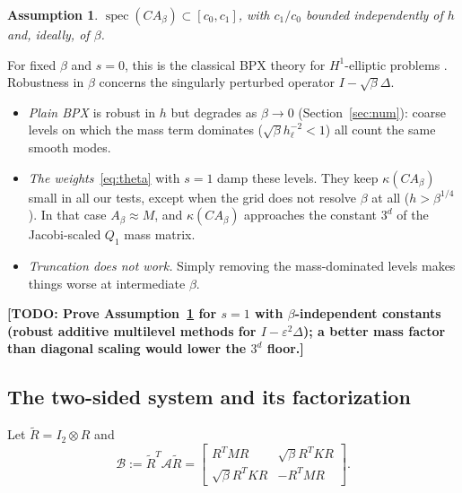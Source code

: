 \documentclass[11pt,a4paper]{article}
\newcommand{\A}{\mathcal{A}}
\newcommand{\B}{\mathcal{B}}
\newcommand{\Rt}{\widetilde R}
\newcommand{\todo}[1]{\textbf{[TODO: #1]}}
\newtheorem{assumption}[theorem]{Assumption}
\theoremstyle{remark}
\begin{document}
\begin{assumption}\label{ass:bpx}
$\operatorname{spec}(CA_\beta)\subset[c_0,c_1]$, with $c_1/c_0$ bounded independently of $h$
and, ideally, of $\beta$.
\end{assumption}

For fixed $\beta$ and $s=0$, this is the classical BPX theory for
$H^1$-elliptic problems \cite{BPX90,Xu92,Oswald94}. Robustness in $\beta$
concerns the singularly perturbed operator $I-\sqrt\beta\Delta$.
\begin{itemize}
\item \emph{Plain BPX} is robust in $h$ but degrades as $\beta\to0$
  (Section~\ref{sec:num}): coarse levels on which the mass term dominates
  ($\sqrt\beta h_\ell^{-2}<1$) all count the same smooth modes.
\item \emph{The weights}~\eqref{eq:theta} with $s=1$ damp these levels. They
  keep $\kappa(CA_\beta)$ small in all our tests, except when the grid does
  not resolve $\beta$ at all ($h>\beta^{1/4}$). In that case $A_\beta\approx M$,
  and $\kappa(CA_\beta)$ approaches the constant $3^d$ of the Jacobi-scaled
  $Q_1$ mass matrix.
\item \emph{Truncation does not work.} Simply removing the mass-dominated
  levels makes things worse at intermediate $\beta$.
\end{itemize}
\todo{Prove Assumption~\ref{ass:bpx} for $s=1$ with $\beta$-independent
constants (robust additive multilevel methods for $I-\varepsilon^2\Delta$); a better
mass factor than diagonal scaling would lower the $3^d$ floor.}

\subsection{The two-sided system and its factorization}

Let $\Rt=I_2\otimes R$ and
\begin{equation}\label{eq:B}
\B:=\Rt^T\A\Rt=\begin{bmatrix}R^TMR & \sqrt\beta R^TKR\\ \sqrt\beta R^TKR & -R^TMR\end{bmatrix}.
\end{equation}
\end{document}
